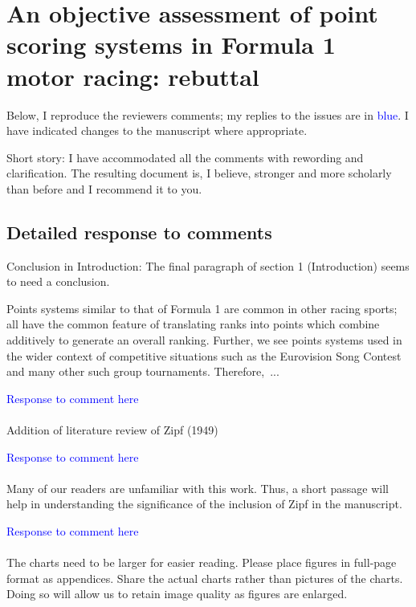 \documentclass[12pt]{article}
\begin{document}
\section*{An objective assessment of point scoring systems in Formula 1 motor racing: rebuttal}


Below, I reproduce the reviewers comments; my replies to the issues
are in \textcolor{blue}{blue}.  I have indicated changes to the
manuscript where appropriate.

Short story: I have accommodated all the comments with rewording and
clarification.  The resulting document is, I believe, stronger and
more scholarly than before and I recommend it to you.


\subsection*{Detailed response to comments}

Conclusion in Introduction: The final paragraph of section 1
(Introduction) seems to need a conclusion.

Points systems similar to that of Formula 1 are common in other racing
sports; all have the common feature of translating ranks into points
which combine additively to generate an overall ranking.  Further, we
see points systems used in the wider context of competitive situations
such as the Eurovision Song Contest and many other such group
tournaments.  \mbox{Therefore, ...}

\textcolor{blue}{Response to comment here}\\ \\


Addition of literature review of Zipf (1949)

\textcolor{blue}{Response to comment here}\\ \\

Many of our readers are unfamiliar with this work.  Thus, a short
passage will help in understanding the significance of the inclusion
of Zipf in the manuscript.

\textcolor{blue}{Response to comment here}\\ \\


The charts need to be larger for easier reading.  Please place figures
in full-page format as appendices. Share the actual charts rather than
pictures of the charts. Doing so will allow us to retain image quality
as figures are enlarged.
\end{document}
